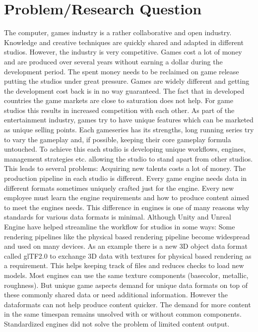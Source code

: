 \documentclass[10pt,a4paper]{article}
\begin{document}
\section{Problem/Research Question}
\begin{multicols}{2}
The computer, games industry is a rather collaborative and open industry. Knowledge and creative techniques are quickly shared and adapted in different studios. However, the industry is very competitive. Games cost a lot of money and are produced over several years without earning a dollar during the development period. The spent money needs to be reclaimed on game release putting the studios under great pressure. Games are widely different and getting the development cost back is in no way guaranteed. The fact that in developed countries the game markets are close to saturation\cite{Koster2018} does not help. For game studios this results in increased competition with each other. As part of the entertainment industry, games try to have unique features which can be marketed as unique selling points. Each gameseries has its strengths, long running series try to vary the gameplay and, if possible, keeping their core gameplay formula untouched. To achieve this each studio is developing unique workflows, engines, management strategies etc. allowing the studio to stand apart from other studios. This leads to several problems: Acquiring new talents costs a lot of money. The production pipeline in each studio is different. Every game engine needs data in different formats sometimes uniquely crafted just for the engine. Every new employee must learn the engine requirements and how to produce content aimed to meet the engines needs. This difference in engines is one of many reasons why standards for various data formats is minimal. Although Unity and Unreal Engine have helped streamline the workflow for studios in some ways: Some rendering pipelines like the physical based rendering pipeline become widespread and used on many devices. As an example there is a new 3D object data format called glTF2.0 to exchange 3D data with textures for physical based rendering as a requirement\cite{TheKhronosGroup}. This helps keeping track of files and reduces checks to load new models. Most engines can use the same texture components (basecolor, metallic, roughness). But unique game aspects demand for unique data formats on top of these commonly shared data or need additional information. However the dataformats can not help produce content quicker. The demand for more content in the same timespan remains unsolved with or without common components. Standardized engines did not solve the problem of limited content output\cite{Koster2018}.


\end{multicols}
\end{document}
